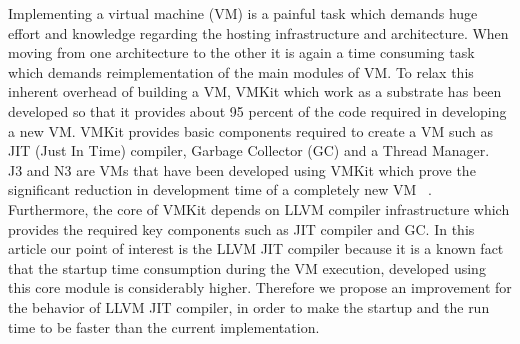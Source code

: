 
\label{sec:introduction}

Implementing a virtual machine (VM) is a painful task which demands huge effort and knowledge regarding the hosting infrastructure and architecture. When moving from one architecture to the other it is again a time consuming task which demands reimplementation of the main modules of VM. To relax this inherent overhead of building a VM, VMKit which work as a substrate has been developed so that it provides about 95 percent of the code required in developing a new VM. VMKit provides basic components required to create a VM such as JIT (Just In Time) compiler, Garbage Collector (GC) and a Thread Manager.\\
J3 and N3 are VMs that have been developed using VMKit which prove the significant reduction in development time of a completely new VM ~\cite{arch1}. Furthermore, the core of VMKit depends on LLVM compiler infrastructure which provides the required key components such as JIT compiler and GC. In this article our point of interest is the LLVM JIT compiler because it is a known fact that the startup time consumption during the VM execution, developed using this core module is considerably higher. Therefore we propose an improvement for the behavior of LLVM JIT compiler, in order to make the startup and the run time to be faster than the current implementation. 

